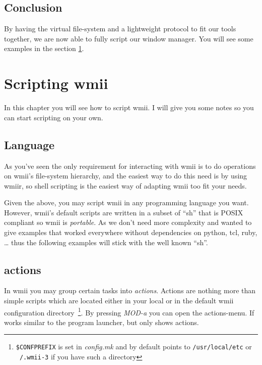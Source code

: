 \documentclass[12pt,a4paper]{article} %
\begin{document}
  \subsection{Conclusion}

    By having the virtual file-system and a lightweight protocol to
    fit our tools together, we are now able to fully script our window
    manager. You will see some examples in the section
    \ref{sec:scripting}.

\section{Scripting wmii}
\label{sec:scripting}

  In this chapter you will see how to script wmii. I will give you
  some notes so you can start scripting on your own.

  \subsection{Language}

    As you've seen the only requirement for interacting with wmii is
    to do operations on wmii's file-system hierarchy, and the easiest
    way to do this need is by using wmiir, so shell scripting is the
    easiest way of adapting wmii too fit your needs.

    Given the above, you may script wmii in any programming language
    you want. However, wmii's default scripts are written in a subset
    of ``sh'' that is POSIX compliant so wmii is \emph{portable}.  As
    we don't need more complexity and wanted to give examples that
    worked everywhere without dependencies on python, tcl, ruby, \dots
    thus the following examples will stick with the well known ``sh''.


  \subsection{actions}

    In wmii you may group certain tasks into \emph{actions}. Actions
    are nothing more than simple scripts which are located either in
    your local or in the default wmii configuration
    directory~\footnote{ \texttt{\$CONFPREFIX} is set in
    \emph{config.mk} and by default points to \texttt{/usr/local/etc}
    or \texttt{~/.wmii-3} if you have such a directory}.
    By pressing \emph{MOD-a} you can open the actions-menu. If works
    similar to the program launcher, but only shows actions.
\end{document}
